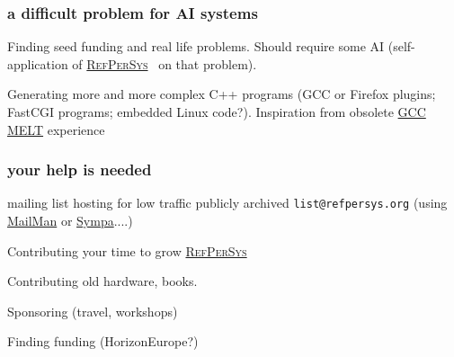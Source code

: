 \documentclass[xcolor=svgnames,final,smaller,a4]{beamer}
\newcommand{\RefPerSys}{\href{http://refpersys.org}{\textsc{RefPerSys}}}
\begin{document}
  \begin{frame}
    \frametitle{a difficult problem for AI systems}

    \medskip
    
    Finding seed funding and real life problems. Should require some AI (self-application of \RefPerSys~ on that problem).

    \bigskip
    
    Generating more and more complex C++ programs (GCC or Firefox
    plugins; FastCGI programs; embedded Linux code?). Inspiration from
    obsolete \href{http://www.starynkevitch.net/Basile/gcc-melt/}{GCC
      MELT} experience {}
    
  \end{frame}

  
  \begin{frame}
    \frametitle{your help is needed}

    \medskip

    mailing list hosting for low traffic publicly archived
    \texttt{list@refpersys.org} (using
    \href{http://list.org/}{MailMan} or
    \href{https://www.sympa.org/}{Sympa}....)
    \medskip
    
    Contributing your time to grow \RefPerSys

    \medskip
    
    Contributing old hardware, books.

    \medskip
    
    Sponsoring (travel, workshops)

    \medskip

    Finding funding (HorizonEurope?)
    
  \end{frame}
  
\end{document}
